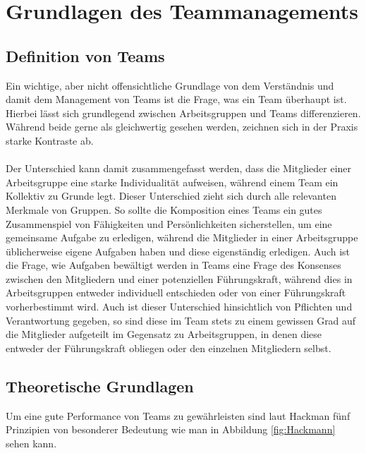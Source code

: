 \chapter{Grundlagen des Teammanagements}

\section{Definition von Teams }
Ein wichtige, aber nicht offensichtliche Grundlage von dem Verständnis und damit dem Management von Teams ist die Frage, was ein Team überhaupt ist. Hierbei lässt sich grundlegend zwischen Arbeitsgruppen und Teams differenzieren. Während beide gerne als gleichwertig gesehen werden, zeichnen sich in der Praxis starke Kontraste ab.\\\\
Der Unterschied kann damit zusammengefasst werden, dass die Mitglieder einer Arbeitsgruppe eine starke Individualität aufweisen, während einem Team ein Kollektiv zu Grunde legt. Dieser Unterschied zieht sich durch alle relevanten Merkmale von Gruppen. So sollte die Komposition eines Teams ein gutes Zusammenspiel von Fähigkeiten und Persönlichkeiten sicherstellen, um eine gemeinsame Aufgabe zu erledigen, während die Mitglieder in einer Arbeitsgruppe üblicherweise eigene Aufgaben haben und diese eigenständig erledigen. Auch ist die Frage, wie Aufgaben bewältigt werden in Teams eine Frage des Konsenses zwischen den Mitgliedern und einer potenziellen Führungskraft, während dies in Arbeitsgruppen entweder individuell entschieden oder von einer Führungskraft vorherbestimmt wird. Auch ist dieser Unterschied hinsichtlich von Pflichten und Verantwortung gegeben, so sind diese im Team stets zu einem gewissen Grad auf die Mitglieder aufgeteilt im Gegensatz zu Arbeitsgruppen, in denen diese entweder der Führungskraft obliegen oder den einzelnen Mitgliedern selbst.

\section{Theoretische Grundlagen }
Um eine gute Performance von Teams zu gewährleisten sind laut Hackman fünf Prinzipien von besonderer Bedeutung wie man in Abbildung \ref{fig:Hackmann} sehen kann.

